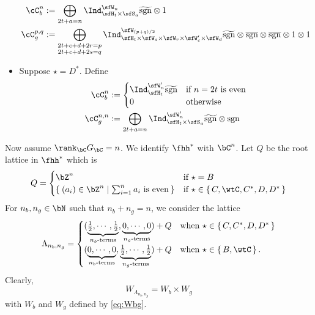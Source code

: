 \documentclass[12pt,a4paper]{amsart}
\newcommand{\Res}{\mathrm{Res}}
\newcommand{\sgn}{\operatorname{sgn}}
\numberwithin{equation}{section}
\theoremstyle{remark}
\def\half{{\tfrac{1}{2}}}
\def\Cint#1{\Coh_{[#1]}}
\def\Gc{G_\bC}
\def\Coh{\mathrm{Coh}}
\def\hsgn{\widetilde{\mathrm{sgn}}}
\def\bsgn{\overline{\sgn}}
\begin{document}
\begin{itemize}
\[\begin{split}
          \cC_b^{n} & :=
          \bigoplus_{\substack{2t+a=n}}
          \Ind_{\sfH_{t}\times \sfS_{a}}^{\sfW_{n}} \hsgn\otimes 1\\
          \cC_g^{p,q} %
           & := \bigoplus_{\substack{2t+c+d+2r=p\\2t+c+d+2s=q}}
            \Ind_{\sfH_{t} \times \sfW_s\times \sfW_r\times \sfW'_{c}\times \sfW_{d} }^{\sfW_{(p+q)/2}} \hsgn \otimes \bsgn \otimes \bsgn \otimes 1\otimes 1 %
          \\
        \end{split}
        \]
  \item Suppose $\star=D^{*}$. Define
        \[
        \begin{split}
          \cC_b^{n} & :=
          \begin{cases}
            \Ind_{\sfH_{t}}^{\sfW'_{n}} \hsgn &
            \text{if $n=2t$ is even} \\
            0 & \text{otherwise}\\
          \end{cases}\\
          \cC_g^{n,n} %
          &:=\bigoplus_{\substack{2t+a=n}} \Ind_{\sfH_{t} \times \sfS_{a}}^{\sfW'_{n}}
          \hsgn \otimes \sgn \\
        \end{split}
        \]
\end{itemize}

Now assume $\rank_{\bC} \Gc = n$.
We identify $\fhh^{*}$ with $\bC^{n}$.
Let $Q$ be the root lattice in $\fhh^{*}$
which is
\[
Q = \begin{cases}
  \bZ^{n} & \text{if  $\star = B$}\\
  \Set{(a_{i})\in \bZ^{n}|\sum_{i=1}^{n}a_{i} \text{ is even}}
    & \text{if  $\star \in \set{C,\wtC,C^{*},D,D^{*}}$}\\
\end{cases}
\]
For $n_{b}, n_{g}\in \bN$ such that $n_{b}+n_{g}=n$, we consider the lattice
\[
  \Lambda_{n_{b},n_{g}} =
  \begin{cases}
  (\underbrace{\half, \cdots, \half}_{n_{b}\text{-terms}}, \underbrace{0, \cdots, 0}_{n_{g}\text{-terms}}) + Q & \text{when
  } \star\in \set{C,C^{*}, D,D^{*}}\\%
  (\underbrace{0, \cdots, 0}_{n_{b}\text{-terms}}, \underbrace{\half, \cdots, \half}_{n_{g}\text{-terms}}) + Q & \text{when
  } \star\in \set{B,\wtC}. %
\end{cases}
\]
Clearly,
\[
  W_{\Lambda_{n_{b},n_{g}}}= W_{b}\times W_{g}
\]
with $W_{b}$ and $W_{g}$ defined by \eqref{eq:Wbg}.
\end{document}
